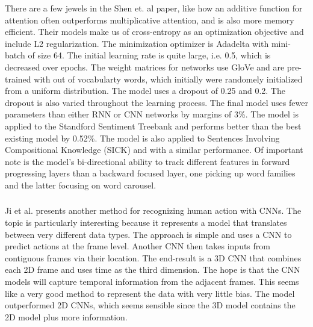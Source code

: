 There are a few jewels in the Shen et. al paper, like how an additive function for attention often outperforms multiplicative attention, and is also more memory efficient.  Their models make us of cross-entropy as an optimization objective and include L2 regularization.  The minimization optimizer is Adadelta with mini-batch of size 64.  The initial learning rate is quite large, i.e. 0.5, which is decreased over epochs.  The weight matrices for networks use GloVe and are pre-trained with out of vocabularty words, which initially were randomely initialized from a uniform distribution.  The model uses a dropout of 0.25 and 0.2.  The dropout is also varied throughout the learning process.  The final model uses fewer parameters than either RNN or CNN networks by margins of 3\%.  The model is applied to the Standford Sentiment Treebank and performs better than the best existing model by 0.52\%.  The model is also applied to Sentences Involving Compositional Knowledge (SICK) and with a similar performance.  Of important note is the model's bi-directional ability to track different features in forward progressing layers than a backward focused layer, one picking up word families and the latter focusing on word carousel.

\subsubsection{}
Ji et al. presents another method for recognizing human action with CNNs.  The topic is particularly interesting because it represents a model that translates between very different data types.   The approach is simple and uses a CNN to predict actions at the frame level.  Another CNN then takes inputs from contiguous frames via their location.  The end-result is a 3D CNN that combines each 2D frame and uses time as the third dimension.  The hope is that the CNN models will capture temporal information from the adjacent frames.  This seems like a very good method to represent the data with very little bias.  The model outperformed 2D CNNs, which seems sensible since the 3D model contains the 2D model plus more information.

